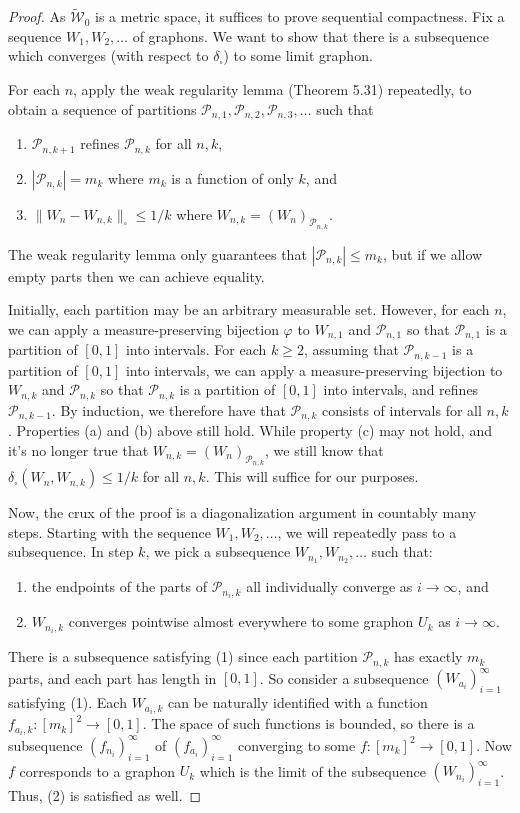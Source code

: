 \begin{proof}
As $\widetilde{\mathcal W}_0$ is a metric space, it suffices to prove sequential compactness. Fix a sequence $W_1,W_2,\ldots$ of graphons. We want to show that there is a subsequence which converges (with respect to $\delta_\square$) to some limit graphon.

For each $n$, apply the weak regularity lemma (Theorem 5.31) repeatedly, to obtain a sequence of partitions $\mathcal P_{n,1},\mathcal P_{n,2},\mathcal P_{n,3},\ldots$ such that
\begin{enumerate}[label=(\alph*)]
\item $\mathcal P_{n,k+1}$ refines $\mathcal P_{n,k}$ for all $n,k$,
\item $|\mathcal P_{n,k}|=m_k$ where $m_k$ is a function of only $k$, and
\item $\|W_n-W_{n,k}\|_\square\leq1/k$ where $W_{n,k}=(W_n)_{\mathcal P_{n,k}}$.
\end{enumerate}
The weak regularity lemma only guarantees that $|\mathcal P_{n,k}|\leq m_k$, but if we allow empty parts then we can achieve equality.

Initially, each partition may be an arbitrary measurable set. However, for each $n$, we can apply a measure-preserving bijection $\varphi$ to $W_{n,1}$ and $\mathcal P_{n,1}$ so that $\mathcal P_{n,1}$ is a partition of $[0,1]$ into intervals. For each $k\geq2$, assuming that $\mathcal P_{n,k-1}$ is a partition of $[0,1]$ into intervals, we can apply a measure-preserving bijection to $W_{n,k}$ and $\mathcal P_{n,k}$ so that $\mathcal P_{n,k}$ is a partition of $[0,1]$ into intervals, and refines $\mathcal P_{n,k-1}$. By induction, we therefore have that $\mathcal P_{n,k}$ consists of intervals for all $n,k$. Properties (a) and (b) above still hold. While property (c) may not hold, and it's no longer true that $W_{n,k}=(W_n)_{\mathcal P_{n,k}}$, we still know that $\delta_\square(W_n,W_{n,k})\leq1/k$ for all $n,k$. This will suffice for our purposes.

Now, the crux of the proof is a diagonalization argument in countably many steps. Starting with the sequence $W_1,W_2,\ldots$, we will repeatedly pass to a subsequence. In step $k$, we pick a subsequence $W_{n_1},W_{n_2},\ldots$ such that:
\begin{enumerate}
\item the endpoints of the parts of $\mathcal P_{n_i,k}$ all individually converge as $i\to\infty$, and
\item $W_{n_i,k}$ converges pointwise almost everywhere to some graphon $U_k$ as $i\to\infty$.
\end{enumerate}
There is a subsequence satisfying (1) since each partition $\mathcal P_{n,k}$ has exactly $m_k$ parts, and each part has length in $[0,1]$. So consider a subsequence $(W_{a_i})_{i=1}^\infty$ satisfying (1). Each $W_{a_i,k}$ can be naturally identified with a function $f_{a_i,k}:[m_k]^2\to[0,1]$. The space of such functions is bounded, so there is a subsequence $(f_{n_i})_{i=1}^\infty$ of $(f_{a_i})_{i=1}^\infty$ converging to some $f:[m_k]^2\to[0,1]$. Now $f$ corresponds to a graphon $U_k$ which is the limit of the subsequence $(W_{n_i})_{i=1}^\infty$. Thus, (2) is satisfied as well.


\end{proof}
